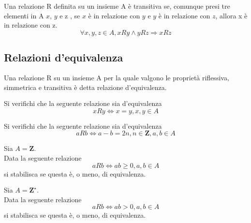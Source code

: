 \begin{flushleft}
\begin{definizione}
Una relazione R definita su un insieme A è transitiva se, comunque presi tre elementi in A $x$, $y$ e z , se $x$ è in relazione con $y$ e $y$ è in relazione con $z$, allora x è in relazione con z.
\[\forall x, y, z \in A, xRy\land yRz \Rightarrow xRz\]
\end{definizione}


\subsection{Relazioni d'equivalenza}
\begin{definizione}
Una relazione R su un insieme A per la quale valgono le proprietà riflessiva, simmetrica e transitiva è detta relazione d'equivalenza.
\end{definizione}
\begin{esercizio}
Si verifichi che la seguente relazione sia d'equivalenza
\[xRy \Leftrightarrow x = y, x, y \in A\]
\end{esercizio}
\vspace{150px}

\begin{esercizio}
Si verifichi che la seguente relazione sia d'equivalenza
\[aRb \Leftrightarrow a-b = 2n, n\in \mathbf{Z}, a,b \in A\]
\end{esercizio}
\vspace{150px}

\begin{esercizio}
Sia $A = \mathbf{Z}$.\\
Data la seguente relazione
\[aRb \Leftrightarrow ab\geq 0, a,b \in A\]
si stabilisca se questa è, o meno, di equivalenza.\\
\end{esercizio}
\vspace{150px}

\begin{esercizio}
Sia $A = \mathbf{Z}^{\star}$.\\
Data la seguente relazione
\[aRb \Leftrightarrow ab> 0, a,b \in A\]
si stabilisca se questa è, o meno, di equivalenza.\\
\end{esercizio}
\vspace{150px}


\end{flushleft}
